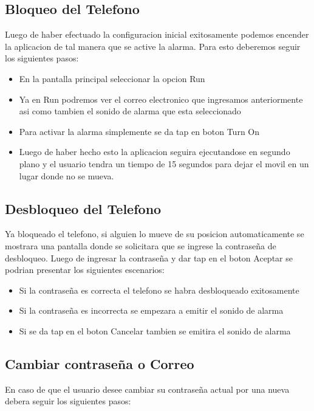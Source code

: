 \documentclass[12pt,letterpaper]{article}
\begin{document}
\subsection{Bloqueo del Telefono}
Luego de haber efectuado la configuracion inicial exitosamente podemos encender la aplicacion de tal manera que se active la alarma. Para esto deberemos seguir los siguientes pasos:

 \begin{itemize}

\item{En la pantalla principal seleccionar la opcion Run}
\item{Ya en Run podremos ver el correo electronico que ingresamos anteriormente asi como tambien el sonido de alarma que esta seleccionado}
\item{Para activar la alarma simplemente se da tap en boton Turn On}
\item{Luego de haber hecho esto la aplicacion seguira ejecutandose en segundo plano y el usuario tendra un tiempo de 15 segundos para dejar el movil en un lugar donde no se mueva.}

\end{itemize}



\subsection{Desbloqueo del Telefono}
Ya bloqueado el telefono, si alguien lo mueve de su posicion automaticamente se mostrara una pantalla donde se solicitara que se ingrese la contraseña de desbloqueo. Luego de ingresar la contraseña y dar tap en el boton Aceptar se podrian presentar los siguientes escenarios:

 \begin{itemize}

\item{Si la contraseña es correcta el telefono se habra desbloqueado exitosamente}
\item{Si la contraseña es incorrecta se empezara a emitir el sonido de alarma}
\item{Si se da tap en el boton Cancelar tambien se emitira el sonido de alarma}

\end{itemize}



\subsection{Cambiar contraseña o Correo}
En caso de que el usuario desee cambiar su contraseña actual por una nueva debera seguir los siguientes pasos:
\end{document}
